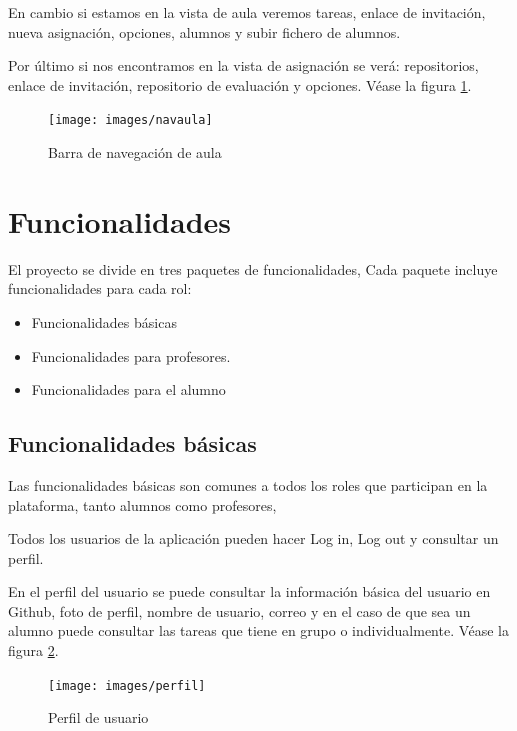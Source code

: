 En cambio si estamos en la vista de aula veremos tareas, enlace de invitación, nueva asignación, opciones, alumnos y subir fichero de alumnos.

Por último si nos encontramos en la vista de asignación se verá: repositorios, enlace de invitación, repositorio de evaluación y opciones.
Véase la figura \ref{fig:Barra de navegacion de aula}.

\begin{figure}[!th]
\begin{center}
\texttt{[image: images/navaula]}
\caption{Barra de navegación de aula}
\label{fig:Barra de navegacion de aula}
\end{center}
\end{figure}


\section{Funcionalidades}
\label{:sec6}

El proyecto se divide en tres paquetes de funcionalidades, Cada paquete incluye funcionalidades para cada rol:

\begin{itemize}
  \item Funcionalidades básicas
  \item Funcionalidades para profesores.
  \item Funcionalidades para el alumno
\end{itemize}

\subsection{Funcionalidades básicas}
\label{3:6:1}

Las funcionalidades básicas son comunes a todos los roles que participan en la plataforma, tanto alumnos como profesores, 

Todos los usuarios de la aplicación pueden hacer Log in, Log out y consultar un perfil.

En el perfil del usuario se puede consultar la información básica del usuario en Github, foto de perfil, nombre de usuario, correo y en el caso de que sea un alumno puede consultar las tareas que tiene en grupo o individualmente.
Véase la figura \ref{fig:Perfil de usuario}.

\begin{figure}[!th]
\begin{center}
\texttt{[image: images/perfil]}
\caption{Perfil de usuario}
\label{fig:Perfil de usuario}
\end{center}
\end{figure}

